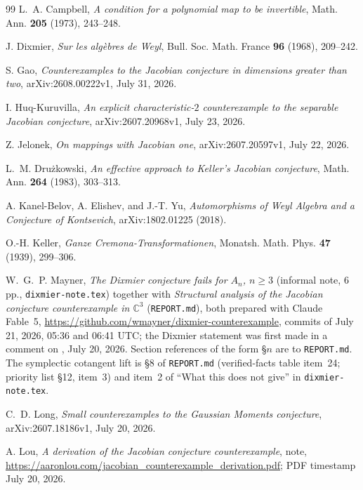 \documentclass[11pt]{amsart}
\newcommand{\CC}{\mathbb{C}}
\theoremstyle{plain}
\theoremstyle{definition}
\theoremstyle{remark}
\begin{document}
\begin{thebibliography}{99}
L.~A. Campbell,
\emph{A condition for a polynomial map to be invertible},
Math. Ann. \textbf{205} (1973), 243--248.

J. Dixmier,
\emph{Sur les alg\`ebres de Weyl},
Bull. Soc. Math. France \textbf{96} (1968), 209--242.

S. Gao,
\emph{Counterexamples to the Jacobian conjecture in dimensions greater
than two},
arXiv:2608.00222v1, July 31, 2026.

I. Huq-Kuruvilla,
\emph{An explicit characteristic-$2$ counterexample to the separable
Jacobian conjecture},
arXiv:2607.20968v1, July 23, 2026.

Z. Jelonek,
\emph{On mappings with Jacobian one},
arXiv:2607.20597v1, July 22, 2026.

L.~M. Dru\.zkowski,
\emph{An effective approach to Keller's Jacobian conjecture},
Math. Ann. \textbf{264} (1983), 303--313.

A. Kanel-Belov, A. Elishev, and J.-T. Yu,
\emph{Automorphisms of Weyl Algebra and a Conjecture of Kontsevich},
arXiv:1802.01225 (2018).

O.-H. Keller,
\emph{Ganze Cremona-Transformationen},
Monatsh. Math. Phys. \textbf{47} (1939), 299--306.

W.~G.~P. Mayner,
\emph{The Dixmier conjecture fails for $A_{n}$, $n\ge3$} (informal note,
6 pp., \texttt{dixmier-note.tex}) together with \emph{Structural analysis
of the Jacobian conjecture counterexample in $\CC^{3}$}
(\texttt{REPORT.md}), both prepared with Claude Fable~5,
\url{https://github.com/wmayner/dixmier-counterexample}, commits of
July 21, 2026, 05:36 and 06:41 UTC; the Dixmier statement was first made
in a comment on \cite{Speyer26}, July 20, 2026. Section references of the
form \S$n$ are to \texttt{REPORT.md}. The symplectic cotangent lift is
\S8 of \texttt{REPORT.md} (verified-facts table item~24; priority
list \S12, item~3) and item~2 of ``What this does not give'' in
\texttt{dixmier-note.tex}.

C.~D. Long,
\emph{Small counterexamples to the Gaussian Moments conjecture},
arXiv:2607.18186v1, July 20, 2026.

A. Lou,
\emph{A derivation of the Jacobian conjecture counterexample},
note, \url{https://aaronlou.com/jacobian_counterexample_derivation.pdf};
PDF timestamp July 20, 2026.


\end{thebibliography}
\end{document}
